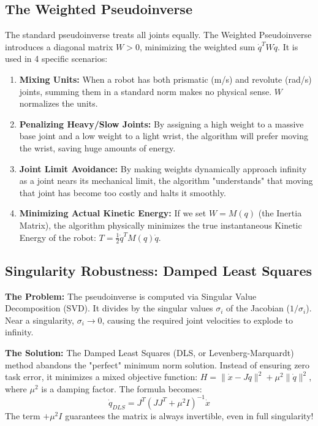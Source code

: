 \documentclass[11pt,a4paper]{article}
\begin{document}
\subsection{The Weighted Pseudoinverse}
The standard pseudoinverse treats all joints equally. The Weighted Pseudoinverse introduces a diagonal matrix $W > 0$, minimizing the weighted sum $\dot{q}^T W \dot{q}$. It is used in 4 specific scenarios:
\begin{enumerate}
    \item \textbf{Mixing Units:} When a robot has both prismatic (m/s) and revolute (rad/s) joints, summing them in a standard norm makes no physical sense. $W$ normalizes the units.
    \item \textbf{Penalizing Heavy/Slow Joints:} By assigning a high weight to a massive base joint and a low weight to a light wrist, the algorithm will prefer moving the wrist, saving huge amounts of energy.
    \item \textbf{Joint Limit Avoidance:} By making weights dynamically approach infinity as a joint nears its mechanical limit, the algorithm "understands" that moving that joint has become too costly and halts it smoothly.
    \item \textbf{Minimizing Actual Kinetic Energy:} If we set $W = M(q)$ (the Inertia Matrix), the algorithm physically minimizes the true instantaneous Kinetic Energy of the robot: $T = \frac{1}{2}\dot{q}^T M(q) \dot{q}$.
\end{enumerate}

\subsection{Singularity Robustness: Damped Least Squares}
\textbf{The Problem:} The pseudoinverse is computed via Singular Value Decomposition (SVD). It divides by the singular values $\sigma_i$ of the Jacobian ($1/\sigma_i$). Near a singularity, $\sigma_i \to 0$, causing the required joint velocities to explode to infinity.

\textbf{The Solution:} The Damped Least Squares (DLS, or Levenberg-Marquardt) method abandons the "perfect" minimum norm solution. Instead of ensuring zero task error, it minimizes a mixed objective function: $H = \|\dot{x} - J\dot{q}\|^2 + \mu^2 \|\dot{q}\|^2$, where $\mu^2$ is a damping factor. The formula becomes:
\begin{equation}
    \dot{q}_{DLS} = J^T(J J^T + \mu^2 I)^{-1} \dot{x}
\end{equation}
The term $+\mu^2 I$ guarantees the matrix is always invertible, even in full singularity!
\end{document}
